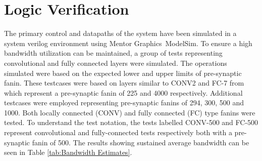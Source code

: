 

\section{Logic Verification}
\label{sec:Logic Verification}

The primary control and datapaths of the system have been simulated in a system verilog environment using Mentor Graphics\textregistered ~ModelSim\texttrademark.
To ensure a high bandwidth utilization can be maintained, a group of tests representing convolutional and fully connected layers were simulated.
The operations simulated were based on the expected lower and upper limits of pre-synaptic fanin. 
These testcases were based on layers similar to CONV2 and FC-7 from \cite{krizhevsky2012imagenet} which represent a pre-synaptic fanin of 225 and 4000 respectively.
Additional testcases were employed representing pre-synaptic fanins of 294, 300, 500 and 1000. Both locally connected (CONV) and fully connected (FC) type fanins were tested.
To understand the test notation, the tests labelled CONV-500 and FC-500 represent convolutional and fully-connected tests respectively both with a pre-synaptic fanin of 500.
The results showing sustained average bandwidth can be seen in Table \ref{tab:Bandwidth Estimates}.


